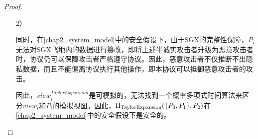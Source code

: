 \begin{proof}
\begin{itemize}
		\item [2）]
		
		同时，在\ref{chap2_system_model}中的安全假设下，由于SGX的完整性保障\cite{SGX_Explained}，$P_i$无法对SGX飞地内的数据进行篡改，即将上述半诚实攻击者升级为恶意攻击者时，协议仍可以保障攻击者严格遵守协议。因此，恶意攻击者不仅推断不出隐私数据，而且不能偏离协议执行其他操作，即本协议可以抵御恶意攻击者的攻击。
		
		因此，$view_i^{TaylorExpansion}$是可模拟的，无法找到一个概率多项式时间算法来区分$view_i$和$P_i$的模拟视图。因此，$\Pi_{\rm TaylorExpansion}(\{P_0, P_1\}, P_2)$在\ref{chap2_system_model}中的安全假设下是安全的。
		
	\end{itemize}

%	
%	
%	
%	
%	
%	
%

\end{proof}
